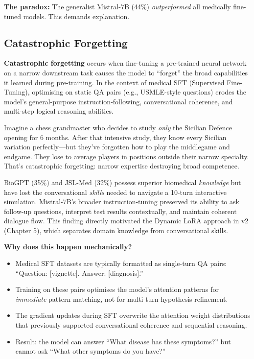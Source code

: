 \textbf{The paradox:} The generalist Mistral-7B (44\%) \textit{outperformed} all medically fine-tuned models. This demands explanation.

\subsection{Catastrophic Forgetting}

\begin{acadbox}[\textcolor{white}{Academic Definition}]
\textbf{Catastrophic forgetting} occurs when fine-tuning a pre-trained neural network on a narrow downstream task causes the model to ``forget'' the broad capabilities it learned during pre-training. In the context of medical SFT (Supervised Fine-Tuning), optimising on static QA pairs (e.g., USMLE-style questions) erodes the model's general-purpose instruction-following, conversational coherence, and multi-step logical reasoning abilities.
\end{acadbox}

\begin{analogybox}[\textcolor{white}{Simple Analogy}]
Imagine a chess grandmaster who decides to study \textit{only} the Sicilian Defence opening for 6 months. After that intensive study, they know every Sicilian variation perfectly---but they've forgotten how to play the middlegame and endgame. They lose to average players in positions outside their narrow specialty. That's catastrophic forgetting: narrow expertise destroying broad competence.
\end{analogybox}

\begin{mattersbox}[\textcolor{white}{Why It Matters for This Thesis}]
BioGPT (35\%) and JSL-Med (32\%) possess superior biomedical \textit{knowledge} but have lost the conversational \textit{skills} needed to navigate a 10-turn interactive simulation. Mistral-7B's broader instruction-tuning preserved its ability to ask follow-up questions, interpret test results contextually, and maintain coherent dialogue flow. This finding directly motivated the Dynamic LoRA approach in v2 (Chapter 5), which separates domain knowledge from conversational skills.
\end{mattersbox}

\textbf{Why does this happen mechanically?}
\begin{itemize}
    \item Medical SFT datasets are typically formatted as single-turn QA pairs: ``Question: [vignette]. Answer: [diagnosis].''
    \item Training on these pairs optimises the model's attention patterns for \textit{immediate} pattern-matching, not for multi-turn hypothesis refinement.
    \item The gradient updates during SFT overwrite the attention weight distributions that previously supported conversational coherence and sequential reasoning.
    \item Result: the model can answer ``What disease has these symptoms?'' but cannot ask ``What other symptoms do you have?''
\end{itemize}

